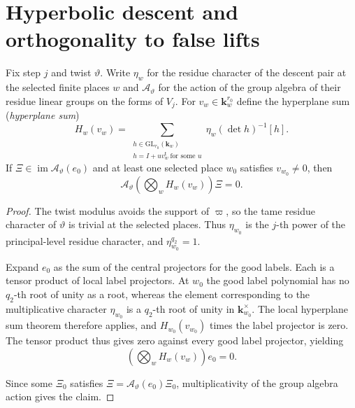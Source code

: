 \section{Hyperbolic descent and orthogonality to false lifts}
\label{sec:c-false-orthogonality}

\begin{lemma}
\label{lem:c-false-hyperplane}
\emitthmsource
Fix step $j$ and twist $\vartheta$. Write $\eta_w$ for the residue character of the descent pair at the selected finite places $w$ and $\mathcal A_\vartheta$ for the action of the group algebra of their residue linear groups on the forms of $V_j$. For $v_w\in\mathbf k_w^{r_0}$ define the hyperplane sum (\emph{hyperplane sum})
\[
 H_w(v_w)=
 \sum_{\substack{h\in\mathrm{GL}_{r_0}(\mathbf k_w)\\
                  h=I+u v_w^{\mathsf t}\ \text{for some }u}}
     \eta_w(\det h)^{-1}[h] .
\]
If $\Xi\in\operatorname{im}\mathcal A_\vartheta(e_0)$ and at least one selected place $w_0$ satisfies $v_{w_0}\ne0$, then
\[
 \mathcal A_\vartheta\left(\bigotimes_w H_w(v_w)\right)\Xi=0 .
\]
\end{lemma}

\begin{proof}
The twist modulus avoids the support of $\varpi$, so the tame residue character of $\vartheta$ is trivial at the selected places. Thus $\eta_{w_0}$ is the $j$-th power of the principal-level residue character, and $\eta_{w_0}^{q_2}=1$.

Expand $e_0$ as the sum of the central projectors for the good labels. Each is a tensor product of local label projectors. At $w_0$ the good label polynomial has no $q_2$-th root of unity as a root, whereas the element corresponding to the multiplicative character $\eta_{w_0}$ is a $q_2$-th root of unity in $\mathbf k_{w_0}^\times$. The local hyperplane sum theorem therefore applies, and $H_{w_0}(v_{w_0})$ times the label projector is zero. The tensor product thus gives zero against every good label projector, yielding
\[
 \left(\bigotimes_w H_w(v_w)\right)e_0=0.
\]

Since some $\Xi_0$ satisfies $\Xi=\mathcal A_\vartheta(e_0)\Xi_0$, multiplicativity of the group algebra action gives the claim.
\end{proof}


